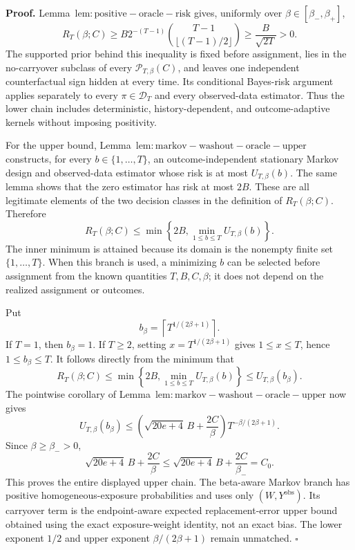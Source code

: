 \textbf{Proof.} Lemma~\(\mathrm{lem:positive-oracle-risk}\) gives, uniformly over \(\beta\in[\beta_-,\beta_+]\),
\[
R_T(\beta;C)
\ge B2^{-(T-1)}\binom{T-1}{\lfloor(T-1)/2\rfloor}
\ge\frac{B}{\sqrt{2T}}>0.
\]
The supported prior behind this inequality is fixed before assignment, lies in the no-carryover subclass of every \(\mathcal P_{T,\beta}(C)\), and leaves one independent counterfactual sign hidden at every time. Its conditional Bayes-risk argument applies separately to every \(\pi\in\mathcal D_T\) and every observed-data estimator. Thus the lower chain includes deterministic, history-dependent, and outcome-adaptive kernels without imposing positivity.

For the upper bound, Lemma~\(\mathrm{lem:markov-washout-oracle-upper}\) constructs, for every \(b\in\{1,\ldots,T\}\), an outcome-independent stationary Markov design and observed-data estimator whose risk is at most \(U_{T,\beta}(b)\). The same lemma shows that the zero estimator has risk at most \(2B\). These are all legitimate elements of the two decision classes in the definition of \(R_T(\beta;C)\). Therefore
\[
R_T(\beta;C)
\le\min\left\{2B,\min_{1\le b\le T}U_{T,\beta}(b)\right\}.
\]
The inner minimum is attained because its domain is the nonempty finite set \(\{1,\ldots,T\}\). When this branch is used, a minimizing \(b\) can be selected before assignment from the known quantities \(T,B,C,\beta\); it does not depend on the realized assignment or outcomes.

Put
\[
b_\beta=\left\lceil T^{1/(2\beta+1)}\right\rceil.
\]
If \(T=1\), then \(b_\beta=1\). If \(T\ge2\), setting \(x=T^{1/(2\beta+1)}\) gives \(1\le x\le T\), hence \(1\le b_\beta\le T\). It follows directly from the minimum that
\[
R_T(\beta;C)
\le\min\left\{2B,\min_{1\le b\le T}U_{T,\beta}(b)\right\}
\le U_{T,\beta}(b_\beta).
\]
The pointwise corollary of Lemma~\(\mathrm{lem:markov-washout-oracle-upper}\) now gives
\[
U_{T,\beta}(b_\beta)
\le\left(\sqrt{20e+4}\,B+\frac{2C}{\beta}\right)T^{-\beta/(2\beta+1)}.
\]
Since \(\beta\ge\beta_->0\),
\[
\sqrt{20e+4}\,B+\frac{2C}{\beta}
\le\sqrt{20e+4}\,B+\frac{2C}{\beta_-}=C_0.
\]
This proves the entire displayed upper chain. The beta-aware Markov branch has positive homogeneous-exposure probabilities and uses only \((W,Y^{\mathrm{obs}})\). Its carryover term is the endpoint-aware expected replacement-error upper bound obtained using the exact exposure-weight identity, not an exact bias. The lower exponent \(1/2\) and upper exponent \(\beta/(2\beta+1)\) remain unmatched. \(\square\)